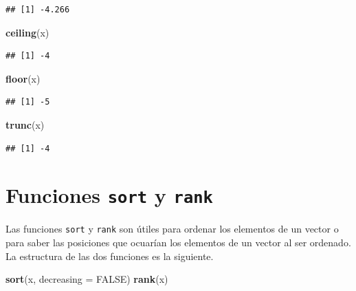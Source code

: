 \documentclass[10pt,]{krantz}
\makeatletter
\newenvironment{Shaded}{\begin{snugshade}}{\end{snugshade}}
\newcommand{\KeywordTok}[1]{\textcolor[rgb]{0.13,0.29,0.53}{\textbf{#1}}}
\newcommand{\DataTypeTok}[1]{\textcolor[rgb]{0.13,0.29,0.53}{#1}}
\newcommand{\OtherTok}[1]{\textcolor[rgb]{0.56,0.35,0.01}{#1}}
\newcommand{\NormalTok}[1]{#1}
\newenvironment{kframe}{%
\medskip{}
\setlength{\fboxsep}{.8em}
 \def\at@end@of@kframe{}%
 \ifinner\ifhmode%
  \def\at@end@of@kframe{\end{minipage}}%
  \begin{minipage}{\columnwidth}%
 \fi\fi%
 \def\FrameCommand##1{\hskip\@totalleftmargin \hskip-\fboxsep
 \colorbox{shadecolor}{##1}\hskip-\fboxsep
     \hskip-\linewidth \hskip-\@totalleftmargin \hskip\columnwidth}%
 \MakeFramed {\advance\hsize-\width
   \@totalleftmargin\z@ \linewidth\hsize
   \@setminipage}}%
 {\par\unskip\endMakeFramed%
 \at@end@of@kframe}
\renewenvironment{Shaded}{\begin{kframe}}{\end{kframe}}
\makeatother
\begin{document}
\begin{verbatim}
## [1] -4.266
\end{verbatim}

\begin{Shaded}
\begin{Highlighting}[]
\KeywordTok{ceiling}\NormalTok{(x)}
\end{Highlighting}
\end{Shaded}

\begin{verbatim}
## [1] -4
\end{verbatim}

\begin{Shaded}
\begin{Highlighting}[]
\KeywordTok{floor}\NormalTok{(x)}
\end{Highlighting}
\end{Shaded}

\begin{verbatim}
## [1] -5
\end{verbatim}

\begin{Shaded}
\begin{Highlighting}[]
\KeywordTok{trunc}\NormalTok{(x)}
\end{Highlighting}
\end{Shaded}

\begin{verbatim}
## [1] -4
\end{verbatim}

\section{\texorpdfstring{Funciones \texttt{sort} y \texttt{rank}
  
}{Funciones sort y rank    }}\label{funciones-sort-y-rank}

Las funciones \texttt{sort} y \texttt{rank} son útiles para ordenar los
elementos de un vector o para saber las posiciones que ocuarían los
elementos de un vector al ser ordenado. La estructura de las dos
funciones es la siguiente.

\begin{Shaded}
\begin{Highlighting}[]
\KeywordTok{sort}\NormalTok{(x, }\DataTypeTok{decreasing =} \OtherTok{FALSE}\NormalTok{)}
\KeywordTok{rank}\NormalTok{(x)}
\end{Highlighting}
\end{Shaded}
\end{document}
